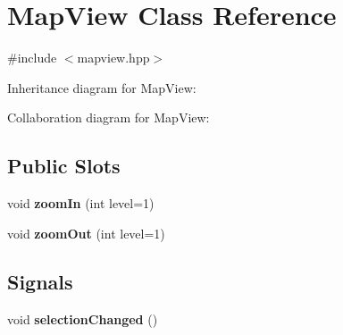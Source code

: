 \hypertarget{classMapView}{}\section{Map\+View Class Reference}
\label{classMapView}


{\ttfamily \#include $<$mapview.\+hpp$>$}



Inheritance diagram for Map\+View\+:


Collaboration diagram for Map\+View\+:
\subsection*{Public Slots}
\begin{DoxyCompactItemize}
\item 
void {\bfseries zoom\+In} (int level=1)\hypertarget{classMapView_a0c0d9fe53da43fd8cfadf9203fb7d61e}{}\label{classMapView_a0c0d9fe53da43fd8cfadf9203fb7d61e}

\item 
void {\bfseries zoom\+Out} (int level=1)\hypertarget{classMapView_a1cb63fdc695345f1dcecc2fef560cfab}{}\label{classMapView_a1cb63fdc695345f1dcecc2fef560cfab}

\end{DoxyCompactItemize}
\subsection*{Signals}
\begin{DoxyCompactItemize}
\item 
void {\bfseries selection\+Changed} ()\hypertarget{classMapView_a55f7517be6358639befca8a6f95ed471}{}\label{classMapView_a55f7517be6358639befca8a6f95ed471}

\end{DoxyCompactItemize}
